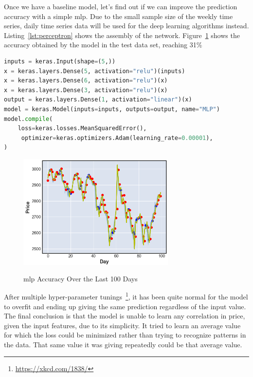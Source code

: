 Once we have a baseline model, let's find out if we can improve the prediction accuracy with a simple \gls{mlp}. Due to the small sample size of the weekly time series, daily time series data will be used for the deep learning algorithms instead. Listing~\ref{lst:perceptron} shows the assembly of the network. Figure~\ref{fig:perceptron} shows the accuracy obtained by the model in the test data set, reaching 31\%

\begin{lstlisting}[language=python,caption=\gls{mlp} Assembly,label={lst:perceptron}]
inputs = keras.Input(shape=(5,))
x = keras.layers.Dense(5, activation="relu")(inputs)
x = keras.layers.Dense(6, activation="relu")(x)
x = keras.layers.Dense(3, activation="relu")(x)
output = keras.layers.Dense(1, activation="linear")(x)
model = keras.Model(inputs=inputs, outputs=output, name="MLP")
model.compile(
    loss=keras.losses.MeanSquaredError(),
     optimizer=keras.optimizers.Adam(learning_rate=0.00001),
)
\end{lstlisting}

\begin{figure}[H]
    \centering
    \caption{\gls{mlp} Accuracy Over the Last 100 Days}
    \includegraphics[width=0.7\textwidth]{figures/mlp.png}
    \label{fig:perceptron}
\end{figure}

After multiple hyper-parameter tunings~\footnote{\url{https://xkcd.com/1838/}}, it has been quite normal for the model to overfit and ending up giving the same prediction regardless of the input value. The final conclusion is that the model is unable to learn any correlation in price, given the input features, due to its simplicity. It tried to learn an average value for which the loss could be minimized rather than trying to recognize patterns in the data. That same value it was giving repeatedly could be that average value.

